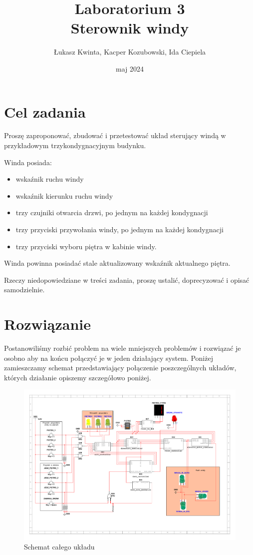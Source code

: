 \documentclass[a4paper]{article}
\title{\fontsize{30pt}{30pt}\selectfont Laboratorium 3 \\ Sterownik windy}
\author{\fontsize{20pt}{20pt}\selectfont Łukasz Kwinta, Kacper Kozubowski, Ida Ciepiela}
\date{maj 2024}
\begin{document}
\maketitle
\pagebreak
\large
\tableofcontents

\pagebreak
\section{Cel zadania}
\Large
Proszę zaproponować, zbudować i przetestować układ sterujący windą w przykładowym trzykondygnacyjnym budynku.

Winda posiada:
\begin{itemize}
    \item wskaźnik ruchu windy
    \item wskaźnik kierunku ruchu windy
    \item trzy czujniki otwarcia drzwi, po jednym na każdej kondygnacji
    \item trzy przyciski przywołania windy, po jednym na każdej kondygnacji
    \item trzy przyciski wyboru piętra w kabinie windy.
\end{itemize}

Winda powinna posiadać stale aktualizowany wskaźnik aktualnego piętra.

Rzeczy niedopowiedziane w treści zadania, proszę ustalić, doprecyzować i opisać samodzielnie.

\pagebreak
\section{Rozwiązanie}
Postanowiliśmy rozbić problem na wiele mniejszych problemów i rozwiązać je osobno aby 
na końcu połączyć je w jeden działający system. Poniżej zamieszczamy schemat 
przedstawiający połączenie poszczególnych układów, których działanie opiszemy szczegółowo poniżej.

\begin{figure}[H]
    \centering
    \includegraphics[width=\textwidth]{elevator_system_schemat.pdf}
    \caption{Schemat całego układu}
\end{figure}
\end{document}
